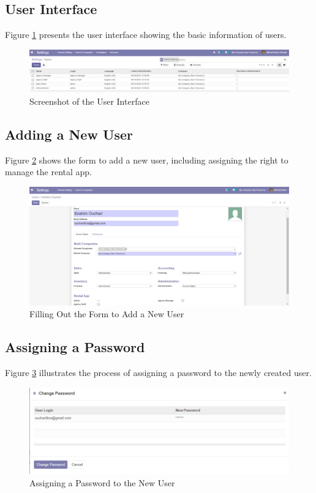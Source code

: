 \subsection{User Interface}
Figure \ref{fig:user_interface} presents the user interface showing the basic information of users.

\begin{figure}[h]
    \centering
    \includegraphics[width=1\textwidth]{sprint4/managesystem2.png} %
    \caption{Screenshot of the User Interface}
    \label{fig:user_interface}
\end{figure}
\newpage
\subsection{Adding a New User}
Figure \ref{fig:add_user_form} shows the form to add a new user, including assigning the right to manage the rental app.

\begin{figure}[h]
    \centering
    \includegraphics[width=1\textwidth]{sprint4/managesystem3.png} %
    \caption{Filling Out the Form to Add a New User}
    \label{fig:add_user_form}
\end{figure}

\subsection{Assigning a Password}
Figure \ref{fig:assign_password} illustrates the process of assigning a password to the newly created user.

\begin{figure}[h]
    \centering
    \includegraphics[width=1\textwidth]{sprint4/managesystem4.png} %
    \caption{Assigning a Password to the New User}
    \label{fig:assign_password}
\end{figure}
\newpage
